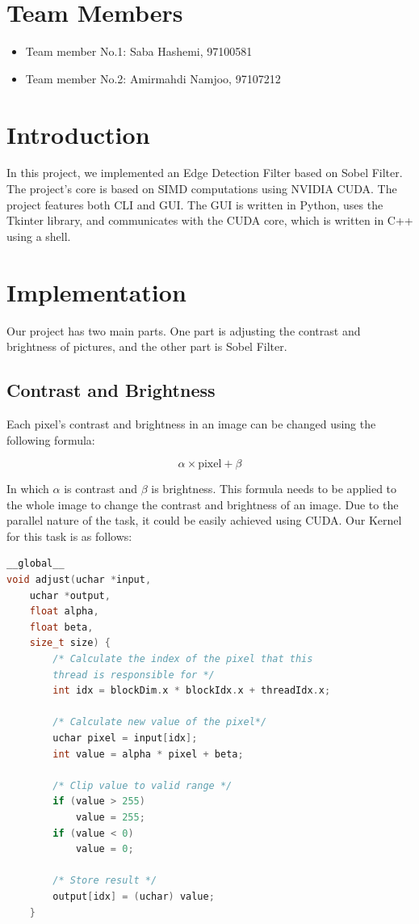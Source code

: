 \documentclass[12pt]{article}
\begin{document}
	
	
		\section{Team Members}
	
	\begin{itemize}
		
		\item Team member No.1: Saba Hashemi, 97100581
		\item Team member No.2: Amirmahdi Namjoo, 97107212
	\end{itemize}
	
\newpage
	\section{Introduction}
	
	
In this project, we implemented an Edge Detection Filter based on Sobel Filter. The project's core is based on SIMD computations using NVIDIA CUDA. The project features both CLI and GUI. The GUI is written in Python, uses the Tkinter library, and communicates with the CUDA core, which is written in C++ using a shell.
\newpage

\section{Implementation}

Our project has two main parts. One part is adjusting the contrast and brightness of pictures, and the other part is Sobel Filter.

\subsection{Contrast and Brightness}

Each pixel's contrast and brightness in an image can be changed using the following formula:

$$\alpha \times \text{pixel} + \beta$$

In which $\alpha$ is contrast and $\beta$ is brightness. This formula needs to be applied to the whole image to change the contrast and brightness of an image. Due to the parallel nature of the task, it could be easily achieved using CUDA. Our Kernel for this task is as follows:

\begin{lstlisting}[language=c++]
__global__
void adjust(uchar *input,
	uchar *output,
	float alpha,
	float beta,
	size_t size) {
		/* Calculate the index of the pixel that this 
		thread is responsible for */
		int idx = blockDim.x * blockIdx.x + threadIdx.x;
		
		/* Calculate new value of the pixel*/
		uchar pixel = input[idx];
		int value = alpha * pixel + beta;

		/* Clip value to valid range */
		if (value > 255)
			value = 255;
		if (value < 0)
			value = 0;
						
		/* Store result */
		output[idx] = (uchar) value;
	}
\end{lstlisting}
\end{document}
